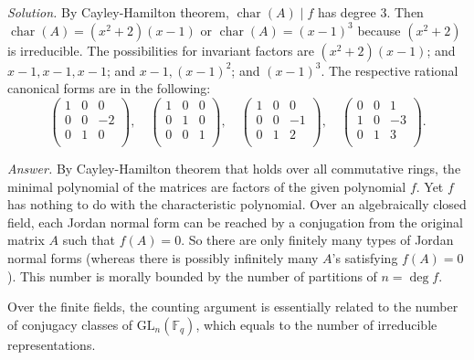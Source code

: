 \documentclass{mathproblems}
\newcommand\F{\mathbb{F}}
\newcommand\GL{\mathrm{GL}}
\begin{document}
\begin{questions}
\textit{Solution.} By Cayley-Hamilton theorem, $\operatorname{char}(A)\mid f$ has degree 3. Then $\operatorname{char}(A)=(x^2+2)(x-1)$ or $\operatorname{char}(A)=(x - 1)^3$ because $(x^2+2)$ is irreducible. The possibilities for invariant factors are $(x^2+2)(x-1)$; and $x-1,x-1,x-1$; and $x-1,(x-1)^2$; and $(x-1)^3$. The respective rational canonical forms are in the following:
$$
\begin{pmatrix}
    1 & 0 & 0\\
    0 & 0 & -2\\
    0 & 1 & 0\\
\end{pmatrix}, \quad
\begin{pmatrix}
    1 & 0 & 0\\
    0 & 1 & 0\\
    0 & 0 & 1\\
\end{pmatrix}, \quad
\begin{pmatrix}
    1 & 0 & 0\\
    0 & 0 & -1\\
    0 & 1 & 2\\
\end{pmatrix}, \quad
\begin{pmatrix}
    0 & 0 & 1\\
    1 & 0 & -3\\
    0 & 1 & 3\\
\end{pmatrix}.
$$


\textit{Answer.} By Cayley-Hamilton theorem that holds over all commutative rings, the minimal polynomial of the matrices are factors of the given polynomial $f$. Yet $f$ has nothing to do with the characteristic polynomial. Over an algebraically closed field, each Jordan normal form can be reached by a conjugation from the original matrix $A$ such that $f(A)=0$. So there are only finitely many types of Jordan normal forms (whereas there is possibly infinitely many $A$'s satisfying $f(A)=0$). This number is morally bounded by the number of partitions of $n=\deg f$.

Over the finite fields, the counting argument is essentially related to the number of conjugacy classes of $\GL_n(\F_q)$, which equals to the number of irreducible representations. 



\end{questions}
\end{document}
